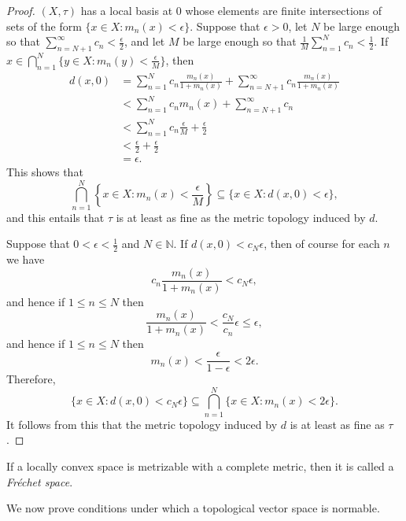 \documentclass{article}
\begin{document}
\begin{proof}
 $(X,\tau)$ has a local basis at $0$ whose elements are finite intersections of sets of the form $\{x \in X: m_n(x)<\epsilon\}$. 
 Suppose that $\epsilon>0$,
  let $N$ be large enough so that $\sum_{n=N+1}^\infty c_n<\frac{\epsilon}{2}$, and let
  $M$ be large enough so that $\frac{1}{M} \sum_{n=1}^N c_n<\frac{1}{2}$. 
 If $x \in \bigcap_{n=1}^N \{y \in X: m_n(y)<\frac{\epsilon}{M}\}$, then 
 \begin{align*}
 d(x,0) &= \sum_{n=1}^N c_n \frac{m_n(x)}{1+m_n(x)} + \sum_{n=N+1}^\infty c_n \frac{m_n(x)}{1+m_n(x)}\\
 &< \sum_{n=1}^N c_n m_n(x) + \sum_{n=N+1}^\infty c_n\\
 &< \sum_{n=1}^N c_n \frac{\epsilon}{M} + \frac{\epsilon}{2}\\
 &<\frac{\epsilon}{2}+\frac{\epsilon}{2}\\
 &=\epsilon.
 \end{align*}
 This shows that 
 \[
 \bigcap_{n=1}^N \left\{x \in X: m_n(x)<\frac{\epsilon}{M}\right\} \subseteq \{x \in X: d(x,0)<\epsilon\},
 \]
 and this entails that $\tau$ is at least as fine as the metric topology induced by $d$.
 
Suppose that $0<\epsilon<\frac{1}{2}$ and  $N \in \mathbb{N}$. If $d(x,0) < c_N \epsilon$, then  of course
for each $n$  we have
\[
c_n \frac{m_n(x)}{1+m_n(x)} <c_N \epsilon,
\]
and hence if $1 \leq n \leq N$ then
\[
\frac{m_n(x)}{1+m_n(x)} < \frac{c_N}{c_n} \epsilon \leq \epsilon,
\]
and hence if $1 \leq n \leq N$ then
\[
m_n(x) < \frac{\epsilon}{1-\epsilon} < 2\epsilon.
\]
Therefore,
\[
\{x \in X: d(x,0)< c_N \epsilon\} \subseteq \bigcap_{n=1}^N \{x \in X: m_n(x)<2\epsilon\}.
\]
It follows from this that the metric topology induced by $d$ is at least as fine as $\tau$.
\end{proof}

If a locally convex space is metrizable with a complete metric, then it is called a {\em Fr\'echet space}.

We now prove conditions under which a topological vector space is
normable. 
\end{document}

